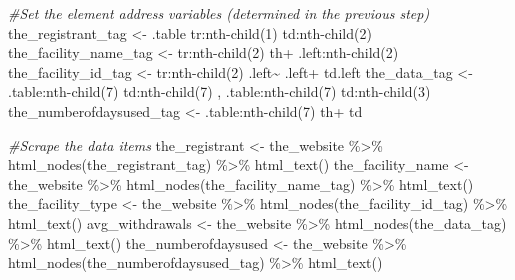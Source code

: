 \documentclass[
  12pt,
]{article}
\newenvironment{Shaded}{\begin{snugshade}}{\end{snugshade}}
\newcommand{\CommentTok}[1]{\textcolor[rgb]{0.56,0.35,0.01}{\textit{#1}}}
\newcommand{\FunctionTok}[1]{\textcolor[rgb]{0.00,0.00,0.00}{#1}}
\newcommand{\NormalTok}[1]{#1}
\newcommand{\OtherTok}[1]{\textcolor[rgb]{0.56,0.35,0.01}{#1}}
\newcommand{\SpecialCharTok}[1]{\textcolor[rgb]{0.00,0.00,0.00}{#1}}
\newcommand{\StringTok}[1]{\textcolor[rgb]{0.31,0.60,0.02}{#1}}
\begin{document}
\begin{Shaded}
\begin{Highlighting}[]
  \CommentTok{\#Set the element address variables (determined in the previous step)}
\NormalTok{  the\_registrant\_tag }\OtherTok{\textless{}{-}} \StringTok{\textquotesingle{}.table tr:nth{-}child(1) td:nth{-}child(2)\textquotesingle{}}
\NormalTok{  the\_facility\_name\_tag }\OtherTok{\textless{}{-}} \StringTok{\textquotesingle{}tr:nth{-}child(2) th+ .left:nth{-}child(2)\textquotesingle{}}
\NormalTok{  the\_facility\_id\_tag }\OtherTok{\textless{}{-}} \StringTok{\textquotesingle{}tr:nth{-}child(2) .left\textasciitilde{} .left+ td.left\textquotesingle{}}
\NormalTok{  the\_data\_tag }\OtherTok{\textless{}{-}} \StringTok{\textquotesingle{}.table:nth{-}child(7) td:nth{-}child(7) , .table:nth{-}child(7) td:nth{-}child(3)\textquotesingle{}}
\NormalTok{  the\_numberofdaysused\_tag }\OtherTok{\textless{}{-}} \StringTok{\textquotesingle{}.table:nth{-}child(7) th+ td\textquotesingle{}}
  
  \CommentTok{\#Scrape the data items}
\NormalTok{  the\_registrant }\OtherTok{\textless{}{-}}\NormalTok{ the\_website }\SpecialCharTok{\%\textgreater{}\%} \FunctionTok{html\_nodes}\NormalTok{(the\_registrant\_tag) }\SpecialCharTok{\%\textgreater{}\%} \FunctionTok{html\_text}\NormalTok{()}
\NormalTok{  the\_facility\_name }\OtherTok{\textless{}{-}}\NormalTok{ the\_website }\SpecialCharTok{\%\textgreater{}\%}   \FunctionTok{html\_nodes}\NormalTok{(the\_facility\_name\_tag) }\SpecialCharTok{\%\textgreater{}\%}  \FunctionTok{html\_text}\NormalTok{()}
\NormalTok{  the\_facility\_type }\OtherTok{\textless{}{-}}\NormalTok{ the\_website }\SpecialCharTok{\%\textgreater{}\%} \FunctionTok{html\_nodes}\NormalTok{(the\_facility\_id\_tag) }\SpecialCharTok{\%\textgreater{}\%} \FunctionTok{html\_text}\NormalTok{()}
\NormalTok{  avg\_withdrawals }\OtherTok{\textless{}{-}}\NormalTok{ the\_website }\SpecialCharTok{\%\textgreater{}\%} \FunctionTok{html\_nodes}\NormalTok{(the\_data\_tag) }\SpecialCharTok{\%\textgreater{}\%} \FunctionTok{html\_text}\NormalTok{()}
\NormalTok{  the\_numberofdaysused }\OtherTok{\textless{}{-}}\NormalTok{ the\_website }\SpecialCharTok{\%\textgreater{}\%} \FunctionTok{html\_nodes}\NormalTok{(the\_numberofdaysused\_tag) }\SpecialCharTok{\%\textgreater{}\%} \FunctionTok{html\_text}\NormalTok{()}
  

\end{Highlighting}
\end{Shaded}
\end{document}

